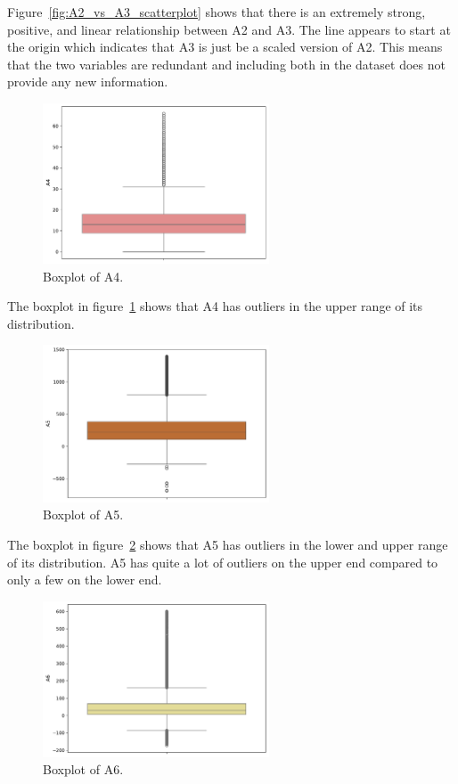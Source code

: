 \documentclass[11pt]{report}
\begin{document}
Figure~\ref{fig:A2_vs_A3_scatterplot} shows that there is an extremely strong, positive, and linear relationship between A2 and A3. The line appears to start at the origin which indicates that A3 is just be a scaled version of A2. This means that the two variables are redundant and including both in the dataset does not provide any new information.

\begin{figure}[H]
    \centering
    \includegraphics[width=0.6\textwidth]{images/A4_boxplot.pdf}
    \caption{Boxplot of A4.}
    \label{fig:a4_boxplot}
\end{figure}

The boxplot in figure~\ref{fig:a4_boxplot} shows that A4 has outliers in the upper range of its distribution.

\begin{figure}[H]
    \centering
    \includegraphics[width=0.6\textwidth]{images/A5_boxplot.pdf}
    \caption{Boxplot of A5.}
    \label{fig:a5_boxplot}
\end{figure}

The boxplot in figure~\ref{fig:a5_boxplot} shows that A5 has outliers in the lower and upper range of its distribution. A5 has quite a lot of outliers on the upper end compared to only a few on the lower end.

\begin{figure}[H]
    \centering
    \includegraphics[width=0.6\textwidth]{images/A6_boxplot.pdf}
    \caption{Boxplot of A6.}
    \label{fig:a6_boxplot}
\end{figure}
\end{document}

